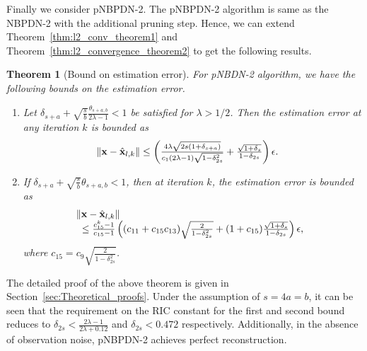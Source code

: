 \documentclass[journal]{IEEEtran}
\newcommand{\mbx}{\mathbf{x}}
\newtheorem{theorem}{Theorem}
\begin{document}
Finally we consider pNBPDN-2. The pNBPDN-2 algorithm is same as the NBPDN-2 with the additional pruning step. Hence, we can extend Theorem~\ref{thm:l2_conv_theorem1} and Theorem~\ref{thm:l2_convergence_theorem2} to get the following results.
\begin{theorem}[Bound on estimation error]
\label{thm:l2_pruning_theorem_convergence}
For pNBDN-2 algorithm, we have the following bounds on the estimation error.
\begin{enumerate}
\item Let $\delta_{s+a}+\sqrt{\frac{s}{b}}\frac{\theta_{s+a,b}}{2\lambda -1} < 1$ be satisfied for $\lambda > 1/2$. Then the estimation error at any iteration $k$ is bounded as
\begin{eqnarray*}
\begin{array}{l}
\hspace{-4mm}\|\mbx-\hat{\mbx}_{l,k}\| \leq \left(\frac{4\lambda \sqrt{2s(1+\delta_{s+a})}}{c_1(2\lambda -1)\sqrt{1-\delta_{2s}^2}} + \frac{\sqrt{1+\delta_s}}{1-\delta_{2s}}\right) \epsilon.
\end{array}
\end{eqnarray*}
\item If $\delta_{s+a}+\sqrt{\frac{s}{b}}\theta_{s+a,b} < 1$, then at iteration $k$, the estimation error is bounded as
\begin{eqnarray*}
\begin{array}{l}
\hspace{-2mm}\|\mbx-\hat{\mbx}_{l,k}\| \\ \leq \frac{c_{15}^k-1}{c_{15}-1}\left((c_{11}+c_{15}c_{13}) \sqrt{\frac{2}{1-\delta_{2s}^2}} + (1+c_{15})\frac{\sqrt{1+\delta_{s}}}{1-\delta_{2s}}\right) \epsilon,
\end{array}
\end{eqnarray*}
where $c_{15} = c_9\sqrt{\frac{2}{1-\delta_{2s}^2}}$. 
\end{enumerate}
\end{theorem}
The detailed proof of the above theorem is given in Section~\ref{sec:Theoretical_proofs}. Under the assumption of $s=4a=b$, it can be seen that the requirement on the RIC constant for the first and second bound reduces to $\delta_{2s} < \frac{2\lambda-1}{2\lambda+0.12}$ and $\delta_{2s} < 0.472$ respectively. Additionally, in the absence of observation noise, pNBPDN-2 achieves perfect reconstruction.
\end{document}
